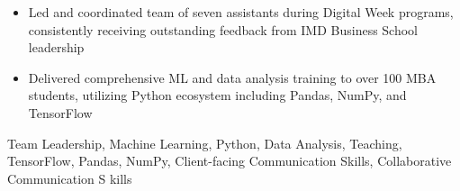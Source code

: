 \begin{experiences}
{\begin{itemize}
                        \item Led and coordinated team of seven assistants during Digital Week programs, consistently receiving outstanding feedback from IMD Business School leadership
                        \item Delivered comprehensive ML and data analysis training to over 100 MBA students, utilizing Python ecosystem including Pandas, NumPy, and TensorFlow
                      \end{itemize}
                    }
                    {Team Leadership, Machine Learning, Python, Data Analysis, Teaching, TensorFlow, Pandas, NumPy, Client-facing Communication Skills, Collaborative Communication S   kills}
  \emptySeparator
  
\end{experiences}

